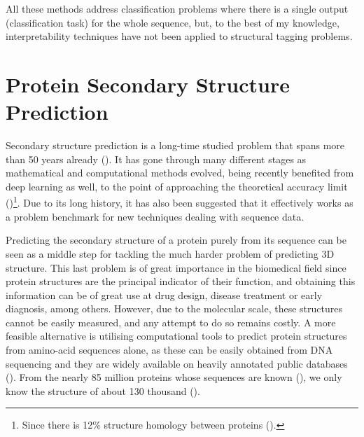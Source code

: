 All these methods address classification problems where there is a single output (classification task) for the whole sequence, but, to the best of my knowledge, interpretability techniques have not been applied to structural tagging problems.


\section{Protein Secondary Structure Prediction}


Secondary structure prediction is a long-time studied problem that spans more than 50 years already (\cite{Pauling1951}). It has gone through many different stages as mathematical and computational methods evolved, being recently benefited from deep learning as well, to the point of approaching the theoretical accuracy limit (\cite{Heffernan2017})\footnote{Since there is 12\% structure homology between proteins (\cite{Rost2001}).}. Due to its long history, it has also been suggested that it effectively works as a problem benchmark for new techniques dealing with sequence data.

Predicting the secondary structure of a protein purely from its sequence can be seen as a middle step for tackling the much harder problem of predicting 3D structure. This last problem is of great importance in the biomedical field since protein structures are the principal indicator of their function, and obtaining this information can be of great use at drug design, disease treatment or early diagnosis, among others. However, due to the molecular scale, these structures cannot be easily measured, and any attempt to do so remains costly. A more feasible alternative is utilising computational tools to predict protein structures from amino-acid sequences alone, as these can be easily obtained from DNA sequencing and they are widely available on heavily annotated public databases (\cite{Dill2012}). From the nearly 85 million proteins whose sequences are known (\cite{Hattori2017}), we only know the structure of about 130 thousand (\cite{Magnan2014}).

